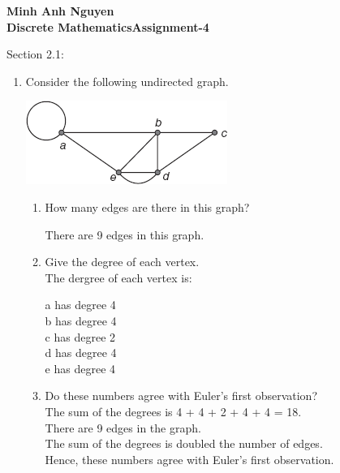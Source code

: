\documentclass[12pt]{article}
\begin{document}
\textbf{Minh Anh Nguyen }\\
\textbf{Discrete Mathematics\hfill Assignment-4}

\hrulefill

Section 2.1:

\begin{enumerate}
  \item Consider the following undirected graph.
  \begin{center}
    \includegraphics{img/img-0.png}
  \end{center}
  
        \begin{enumerate}
          \item How many edges are there in this graph?
          \begin{center}
            There are 9 edges in this graph.
          \end{center}
          
        
          \item Give the degree of each vertex.\\
          The dergree of each vertex is:
          \begin{center}
            a has degree 4\\
            b has degree 4\\
            c has degree 2\\
            d has degree 4\\
            e has degree 4\\
          \end{center}

          \item Do these numbers agree with Euler’s first observation? \\
          The sum of the degrees is 4 + 4 + 2 + 4 + 4 = 18. \\
          There are 9 edges in the graph. \\
          The sum of the degrees is doubled the number of edges.\\
          Hence, these numbers agree with Euler's first observation.
        \end{enumerate}


\end{enumerate}
\end{document}
